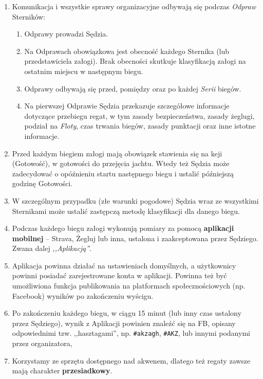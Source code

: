 \documentclass[12pt,a4paper]{article}
\begin{document}
\begin{enumerate}
\begin{enumerate}
\begin{enumerate}
            \item Floty w finale dzielą się na złotą, srebrną itd. (przyjęte nazwy: złota-,,Wilki   Morskie'', kolejne np. ,,Węże Rzeczne'', ,,Szczury Lądowe''). Liczba flot na dany rok ustalana jest na podstawie liczby Uczestników.
            \item Obowiązuje prawo drogi na wodach śródlądowych. Wszelkie odstępstwa od tego są przez Sędziego przekazywane na Odprawie.
        \end{enumerate}
    \end{enumerate}
    
    \item Komunikacja i wszystkie sprawy organizacyjne odbywają się podczas \textit{Odpraw} Sterników:
    \begin{enumerate}
        \item Odprawy prowadzi Sędzia.
        \item Na Odprawach obowiązkowa jest obecność każdego Sternika (lub przedstawiciela załogi). Brak obecności skutkuje klasyfikacją załogi na ostatnim miejscu w następnym biegu.
        \item Odprawy odbywają się przed, pomiędzy oraz po każdej \textit{Serii} biegów.
        \item Na pierwszej Odprawie Sędzia przekazuje szczegółowe informacje dotyczące przebiegu regat, w tym zasady bezpieczeństwa, zasady żeglugi, podział na \textit{Floty}, czas trwania biegów, zasady punktacji oraz inne istotne informacje.
    \end{enumerate}

    \item Przed każdym biegiem załogi mają obowiązek stawienia się na keji (Gotowość), w gotowości do przejęcia jachtu. Wtedy też Sędzia może zadecydować o opóźnieniu startu następnego biegu i ustalić późniejszą godzinę Gotowości.
    \item W szczególnym przypadku (złe warunki pogodowe) Sędzia wraz ze wszystkimi Sternikami może ustalić zastępczą metodę klasyfikacji dla danego biegu.
    \item Podczas każdego biegu załogi wykonują pomiary za pomocą \textbf{aplikacji mobilnej} -- Strava, Żegluj lub inna, ustalona i zaakceptowana przez Sędziego. Zwana dalej \textit{,,Aplikacją''}.
    \item Aplikacja powinna działać na ustawieniach domyślnych, a użytkownicy powinni posiadać zarejestrowane konta w aplikacji. Powinna też być umożliwiona funkcja publikowania na platformach społecznościowych (np. Facebook) wyników po zakończeniu wyścigu.
    \item Po zakończeniu każdego biegu, w ciągu 15 minut (lub inny czas ustalony przez Sędziego), wynik z Aplikacji powinien znaleźć się na FB, opisany odpowiednimi tzw. ,,hasztagami'', np. \texttt{\#akzagh}, \texttt{\#AKZ}, lub innymi podanymi przez organizatora,
    \item Korzystamy ze sprzętu dostępnego nad akwenem, dlatego też regaty zawsze mają charakter \textbf{przesiadkowy}.
\end{enumerate}
\end{document}
